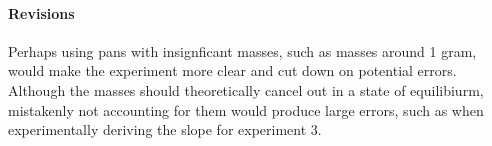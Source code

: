 \documentclass{article}
\begin{document}
\paragraph{Revisions} Perhaps using pans with insignficant masses, such as masses around 
1 gram, would make the experiment more clear and cut down on potential errors. Although the 
masses should theoretically cancel out in a state of equilibiurm, mistakenly not accounting for 
them would produce large errors, such as when experimentally deriving the slope for experiment 3. 
\end{document}

